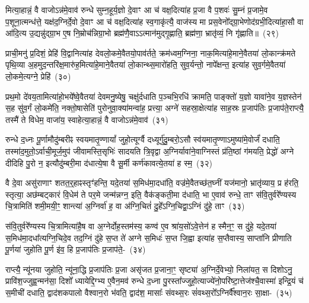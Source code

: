 मित्या॒हान्नं॒ वै वाजो\-ऽन्न॑मे॒वाव॑ रुन्धे सुम्न॒हूर्य॒ज्ञो दे॒वाꣳ आ च॑ वक्ष॒दित्या॑ह प्र॒जा वै प॒शवः॑ सु॒म्नं प्र॒जामे॒व प॒शूना॒त्मन्ध॑त्ते॒ यक्ष॑द॒ग्निर्दे॒वो दे॒वाꣳ आ च॑ वक्ष॒दित्या॑ह स्व॒गाकृ॑त्यै॒ वाज॑स्य मा प्रस॒वेनो᳚द्ग्रा॒भेणोद॑ग्रभी॒दित्या॑हा॒सौ वा आ॑दि॒त्य उ॒द्यन्नु॑द्ग्रा॒भ ए॒ष नि॒म्रोच॑न्निग्रा॒भो ब्रह्म॑णै॒वा\-ऽऽत्मान॑मुद्गृ॒ह्णाति॒ ब्रह्म॑णा॒ भ्रातृ॑व्यं॒ नि गृ॑ह्णाति॥~(२९)\ip

{\anuvakamend[{प्रा॒णैः पोषो᳚\-ऽप्र॒त्याग्नी᳚ध्रे॒ पति॑मे॒ष दश॑ च}]}

प्राची॒मनु॑ प्र॒दिशं॒ प्रेहि॑ वि॒द्वानित्या॑ह देवलो॒कमे॒वैतयो॒पाव॑र्तते॒ क्रम॑ध्वम॒ग्निना॒ नाक॒मित्या॑हे॒माने॒वैतया॑ लो॒कान्क्र॑मते पृथि॒व्या अ॒हमुद॒न्तरि॑क्ष॒मारु॑ह॒मित्या॑हे॒माने॒वैतया॑ लो॒कान्थ्स॒मारो॑हति॒ सुव॒र्यन्तो॒ नापे᳚क्षन्त॒ इत्या॑ह सुव॒र्गमे॒वैतया॑ लो॒कमे॒त्यग्ने॒ प्रेहि॑~(३०)\ip

प्रथ॒मो दे॑वय॒तामित्या॑हो॒भये᳚ष्वे॒वैतया॑ देवमनु॒ष्येषु॒ चक्षु॑र्दधाति प॒ञ्चभि॒रधि॑ क्रामति॒ पाङ्क्तो॑ य॒ज्ञो यावा॑ने॒व य॒ज्ञस्तेन॑ स॒ह सु॑व॒र्गं लो॒कमे॑ति॒ नक्तो॒षासेति॑ पुरोनुवा॒क्या॑मन्वा॑ह॒ प्रत्त्या॒ अग्ने॑ सहस्रा॒क्षेत्या॑ह साह॒स्रः प्र॒जा\-प॑तिः प्र॒जा\-प॑ते॒राप्त्यै॒ तस्मै॑ ते विधेम॒ वाजा॑य॒ स्वाहेत्या॒हान्नं॒ वै वाजो\-ऽन्न॑मे॒वाव॑~(३१)\ip

रुन्धे द॒ध्नः पू॒र्णामौदु॑म्बरीꣴ स्वयमा\-तृ॒ण्णायां᳚ जुहो॒त्यूर्ग्वै दध्यूर्गु॑दु॒म्बरो॒\-ऽसौ स्व॑यमातृ॒ण्णा\-ऽमुष्या॑मे॒वोर्जं॑ दधाति॒ तस्मा॑द॒मुतो॒\-ऽर्वाची॒मूर्ज॒मुप॑ जीवामस्ति॒सृभिः॑ सादयति त्रि॒वृद्वा अ॒ग्निर्यावा॑ने॒वाग्निस्तं प्र॑ति॒ष्ठां ग॑मयति॒ प्रेद्धो॑ अग्ने दीदिहि पु॒रो न॒ इत्यौदु॑म्बरी॒मा द॑धात्ये॒षा वै सू॒र्मी कर्ण॑कावत्ये॒तया॑ ह स्म॒~(३२)\ip

वै दे॒वा असु॑राणाꣳ शतत॒र्॒\mbox{}हाꣴस्तृꣳ॑हन्ति॒ यदे॒तया॑ स॒मिध॑मा॒दधा॑ति॒ वज्र॑मे॒वैतच्छ॑त॒घ्नीं यज॑मानो॒ भ्रातृ॑व्याय॒ प्र ह॑रति॒ स्तृत्या॒ अछ॑म्बट्कारं वि॒धेम॑ ते पर॒मे जन्म॑न्नग्न॒ इति॒ वैक॑ङ्कती॒मा द॑धाति॒ भा ए॒वाव॑ रुन्धे॒ ताꣳ स॑वि॒तुर्वरे᳚ण्यस्य चि॒त्रामिति॑ शमी॒मयी॒ꣳ॒ शान्त्या॑ अ॒ग्निर्वा॑ ह॒ वा अ॑ग्नि॒चितं॑ दु॒हे᳚\-ऽग्नि॒चिद्वा॒\-ऽग्निं दु॑हे॒ ताꣳ~(३३)\ip

स॑वि॒तुर्वरे᳚ण्यस्य चि॒त्रामित्या॑है॒ष वा अ॒ग्नेर्दोह॒स्तम॑स्य॒ कण्व॑ ए॒व श्रा॑य॒सो॑\-ऽवे॒त्तेन॑ ह स्मैन॒ꣳ॒ स दु॑हे॒ यदे॒तया॑ स॒मिध॑मा॒दधा᳚त्यग्नि॒चिदे॒व तद॒ग्निं दु॑हे स॒प्त ते॑ अग्ने स॒मिधः॑ स॒प्त जि॒ह्वा इत्या॑ह स॒प्तैवास्य॒ साप्ता॑नि प्रीणाति पू॒र्णया॑ जुहोति पू॒र्ण इ॑व॒ हि प्र॒जा\-प॑तिः प्र॒जा\-प॑ते॒-~(३४)\ip

राप्त्यै॒ न्यू॑नया जुहोति॒ न्यू॑ना॒द्धि प्र॒जा\-प॑तिः प्र॒जा असृ॑जत प्र॒जाना॒ꣳ॒ सृष्ट्या॑ अ॒ग्निर्दे॒वेभ्यो॒ निला॑यत॒ स दिशो\-ऽनु॒ प्रावि॑श॒ज्जुह्व॒न्मन॑सा॒ दिशो᳚ ध्यायेद्दि॒ग्भ्य ए॒वैन॒मव॑ रुन्धे द॒ध्ना पु॒रस्ता᳚ज्जुहो॒त्याज्ये॑नो॒परि॑ष्टा॒त्तेज॑श्चै॒वास्मा॑ इन्द्रि॒यं च॑ स॒मीची॑ दधाति॒ द्वाद॑श\-कपालो वैश्वान॒रो भ॑वति॒ द्वाद॑श॒ मासाः᳚ संवथ्स॒रः सं॑वथ्स॒रो᳚\-ऽग्निर्वै᳚श्वान॒रः सा॒क्षा-~(३५)\ip

